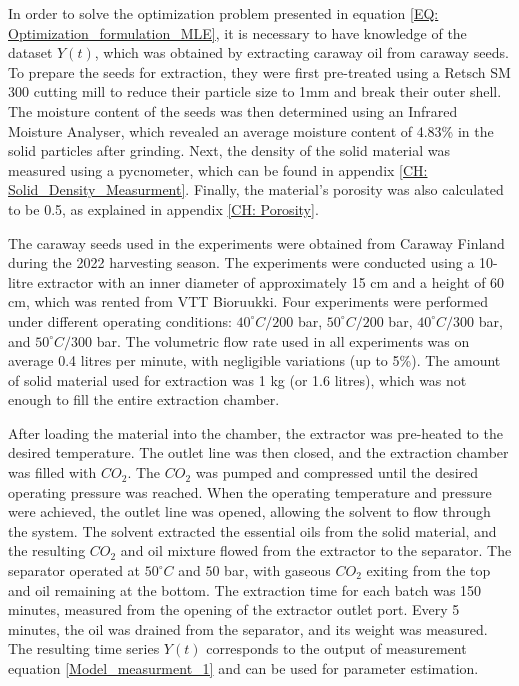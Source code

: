 \documentclass[../Article_Model_Parameters.tex]{subfiles}
\begin{document}
	
	\label{CH: Experiments}
	
	In order to solve the optimization problem presented in equation \ref{EQ: Optimization_formulation_MLE}, it is necessary to have knowledge of the dataset $Y(t)$, which was obtained by extracting caraway oil from caraway seeds. To prepare the seeds for extraction, they were first pre-treated using a Retsch SM 300 cutting mill to reduce their particle size to 1mm and break their outer shell. The moisture content of the seeds was then determined using an Infrared Moisture Analyser, which revealed an average moisture content of 4.83\% in the solid particles after grinding. Next, the density of the solid material was measured using a pycnometer, which can be found in appendix \ref{CH: Solid_Density_Measurment}. Finally, the material's porosity was also calculated to be 0.5, as explained in appendix \ref{CH: Porosity}.
	
	The caraway seeds used in the experiments were obtained from Caraway Finland during the 2022 harvesting season. The experiments were conducted using a 10-litre extractor with an inner diameter of approximately 15 cm and a height of 60 cm, which was rented from VTT Bioruukki. Four experiments were performed under different operating conditions: $40^\circ C / 200$ bar, $50^\circ C / 200$ bar, $40^\circ C / 300$ bar, and $50^\circ C / 300$ bar. The volumetric flow rate used in all experiments was on average 0.4 litres per minute, with negligible variations (up to 5\%). The amount of solid material used for extraction was 1 kg (or 1.6 litres), which was not enough to fill the entire extraction chamber.
	
	After loading the material into the chamber, the extractor was pre-heated to the desired temperature. The outlet line was then closed, and the extraction chamber was filled with $CO_2$. The $CO_2$ was pumped and compressed until the desired operating pressure was reached. When the operating temperature and pressure were achieved, the outlet line was opened, allowing the solvent to flow through the system. The solvent extracted the essential oils from the solid material, and the resulting $CO_2$ and oil mixture flowed from the extractor to the separator. The separator operated at $50^\circ C$ and $50$ bar, with gaseous $CO_2$ exiting from the top and oil remaining at the bottom. The extraction time for each batch was 150 minutes, measured from the opening of the extractor outlet port. Every 5 minutes, the oil was drained from the separator, and its weight was measured. The resulting time series $Y(t)$ corresponds to the output of measurement equation \ref{Model_measurment_1} and can be used for parameter estimation.
	
\end{document}

